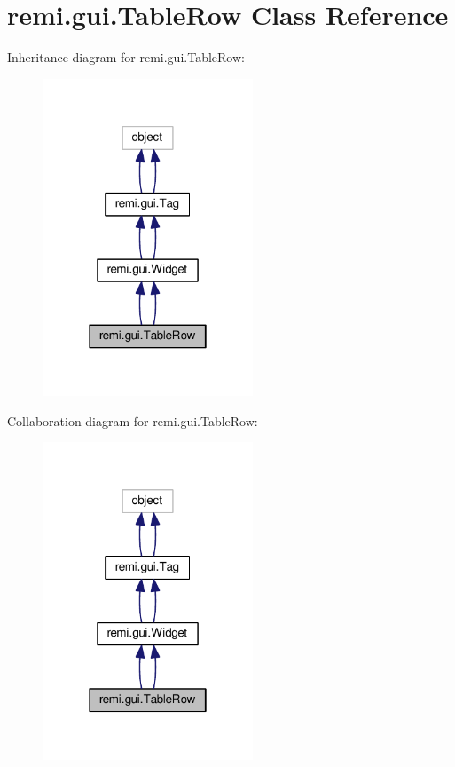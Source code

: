 \hypertarget{classremi_1_1gui_1_1TableRow}{}\section{remi.\+gui.\+Table\+Row Class Reference}
\label{classremi_1_1gui_1_1TableRow}


Inheritance diagram for remi.\+gui.\+Table\+Row\+:
\nopagebreak
\begin{figure}[H]
\begin{center}
\leavevmode
\includegraphics[width=178pt]{d5/d97/classremi_1_1gui_1_1TableRow__inherit__graph}
\end{center}
\end{figure}


Collaboration diagram for remi.\+gui.\+Table\+Row\+:
\nopagebreak
\begin{figure}[H]
\begin{center}
\leavevmode
\includegraphics[width=178pt]{da/d65/classremi_1_1gui_1_1TableRow__coll__graph}
\end{center}
\end{figure}
